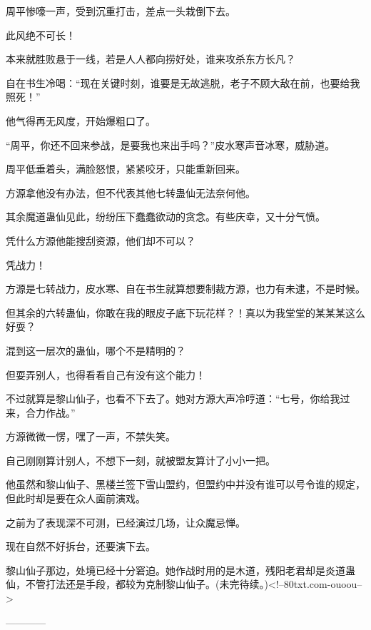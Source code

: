 \begin{this_body}
周平惨嚎一声，受到沉重打击，差点一头栽倒下去。

此风绝不可长！

本来就胜败悬于一线，若是人人都向捞好处，谁来攻杀东方长凡？

自在书生冷喝：“现在关键时刻，谁要是无故逃脱，老子不顾大敌在前，也要给我照死！”

他气得再无风度，开始爆粗口了。

“周平，你还不回来参战，是要我也来出手吗？”皮水寒声音冰寒，威胁道。

周平低垂着头，满脸怒恨，紧紧咬牙，只能重新回来。

方源拿他没有办法，但不代表其他七转蛊仙无法奈何他。

其余魔道蛊仙见此，纷纷压下蠢蠢欲动的贪念。有些庆幸，又十分气愤。

凭什么方源他能搜刮资源，他们却不可以？

凭战力！

方源是七转战力，皮水寒、自在书生就算想要制裁方源，也力有未逮，不是时候。

但其余的六转蛊仙，你敢在我的眼皮子底下玩花样？！真以为我堂堂的某某某这么好耍？

混到这一层次的蛊仙，哪个不是精明的？

但耍弄别人，也得看看自己有没有这个能力！

不过就算是黎山仙子，也看不下去了。她对方源大声冷哼道：“七号，你给我过来，合力作战。”

方源微微一愣，嘿了一声，不禁失笑。

自己刚刚算计别人，不想下一刻，就被盟友算计了小小一把。

他虽然和黎山仙子、黑楼兰签下雪山盟约，但盟约中并没有谁可以号令谁的规定，但此时却是要在众人面前演戏。

之前为了表现深不可测，已经演过几场，让众魔忌惮。

现在自然不好拆台，还要演下去。

黎山仙子那边，处境已经十分窘迫。她作战时用的是木道，残阳老君却是炎道蛊仙，不管打法还是手段，都较为克制黎山仙子。(未完待续。)<!--80txt.com-ouoou-->

------------

\end{this_body}

